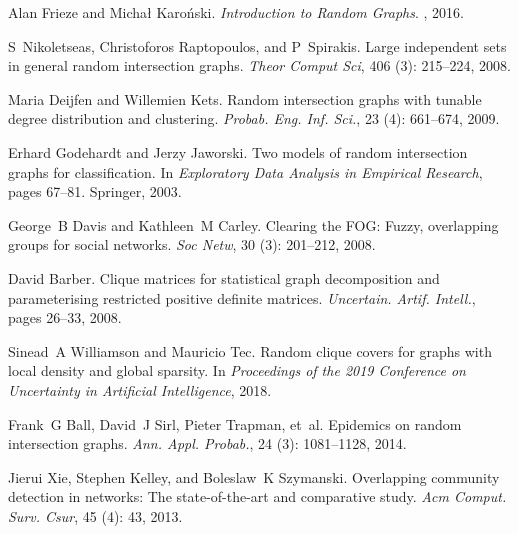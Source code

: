 Alan Frieze and Micha{\l} Karo{\'n}ski.
\newblock \emph{Introduction to Random Graphs}.
, 2016.

S~Nikoletseas, Christoforos Raptopoulos, and P~Spirakis.
\newblock Large independent sets in general random intersection graphs.
\newblock \emph{Theor Comput Sci}, 406 (3): 215--224, 2008.

Maria Deijfen and Willemien Kets.
\newblock Random intersection graphs with tunable degree distribution and
clustering.
\newblock \emph{Probab. Eng. Inf. Sci.}, 23 (4): 661--674,
2009.

Erhard Godehardt and Jerzy Jaworski.
\newblock Two models of random intersection graphs for classification.
\newblock In \emph{Exploratory Data Analysis in Empirical Research}, pages
67--81. {Springer}, 2003.

George~B Davis and Kathleen~M Carley.
\newblock Clearing the {{FOG}}: {{Fuzzy}}, overlapping groups for social
networks.
\newblock \emph{Soc Netw}, 30 (3): 201--212, 2008.

David Barber.
\newblock Clique matrices for statistical graph decomposition and
parameterising restricted positive definite matrices.
\newblock \emph{Uncertain. Artif. Intell.}, pages 26--33, 2008.

Sinead~A Williamson and Mauricio Tec.
\newblock Random clique covers for graphs with local density and global
sparsity.
\newblock In \emph{Proceedings of the 2019 Conference on Uncertainty in
    Artificial Intelligence}, 2018.

Frank~G Ball, David~J Sirl, Pieter Trapman, et~al.
\newblock Epidemics on random intersection graphs.
\newblock \emph{Ann. Appl. Probab.}, 24 (3): 1081--1128,
2014.

Jierui Xie, Stephen Kelley, and Boleslaw~K Szymanski.
\newblock Overlapping community detection in networks: {{The}} state-of-the-art
and comparative study.
\newblock \emph{Acm Comput. Surv. Csur}, 45 (4): 43, 2013.

